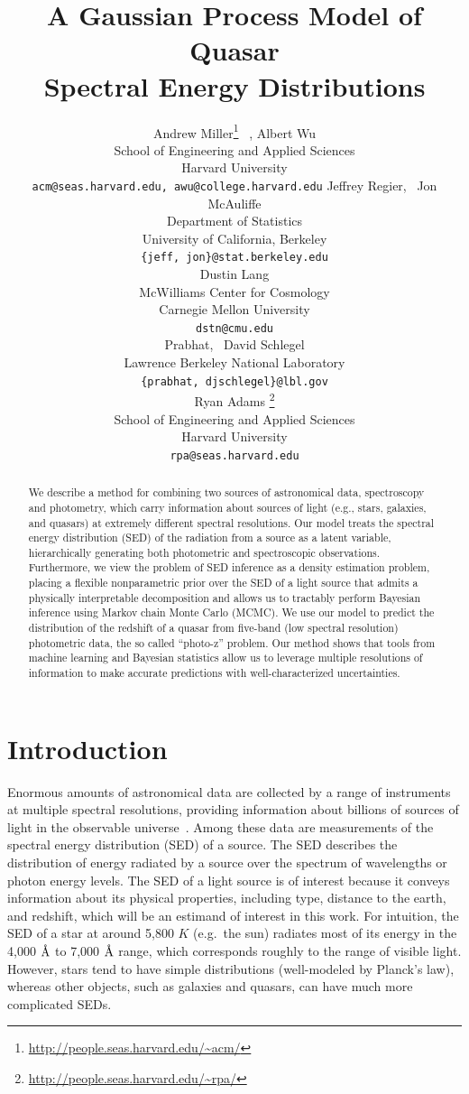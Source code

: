 \documentclass{article} %
\title{A Gaussian Process Model of Quasar \\ Spectral Energy Distributions}
\author{
Andrew Miller\thanks{\url{http://people.seas.harvard.edu/\~acm/}} \, ,  Albert Wu \\
School of Engineering and Applied Sciences\\
Harvard University\\
\texttt{acm@seas.harvard.edu, awu@college.harvard.edu}
\And
Jeffrey Regier, \, Jon McAuliffe \\
Department of Statistics \\
University of California, Berkeley \\
\texttt{\{jeff, jon\}@stat.berkeley.edu} \\
\And
Dustin Lang \\
McWilliams Center for Cosmology \\
Carnegie Mellon University \\
\texttt{dstn@cmu.edu} \\
\And
Prabhat, \, David Schlegel \\
Lawrence Berkeley National Laboratory \\
\texttt{\{prabhat, djschlegel\}@lbl.gov} \\
\And
Ryan Adams \thanks{\url{http://people.seas.harvard.edu/\~rpa/}}\\
School of Engineering and Applied Sciences\\
Harvard University\\
\texttt{rpa@seas.harvard.edu} \\
}
\begin{document}
\maketitle

\begin{abstract} 
We describe a method for combining two sources of astronomical data, spectroscopy and photometry, which carry information about sources of light (e.g., stars, galaxies, and quasars) at extremely different spectral resolutions. 
Our model treats the spectral energy distribution (SED) of the radiation from a source as a latent variable, hierarchically generating both photometric and spectroscopic observations.  
Furthermore, we view the problem of SED inference as a density estimation problem, placing a flexible nonparametric prior over the SED of a light source that admits a physically interpretable decomposition and allows us to tractably perform Bayesian inference using Markov chain Monte Carlo (MCMC).  
We use our model to predict the distribution of the redshift of a quasar from five-band (low spectral resolution) photometric data, the so called ``photo-z'' problem. 
Our method shows that tools from machine learning and Bayesian statistics allow us to leverage multiple resolutions of information to make accurate predictions with well-characterized uncertainties. 
\end{abstract} 

\section{Introduction}
Enormous amounts of astronomical data are collected by a range of instruments at multiple spectral resolutions, providing information about billions of sources of light in the observable universe~\cite{alam2015eleventh, martin2005galex}.  
Among these data are measurements of the spectral energy distribution (SED) of a source.  
The SED describes the distribution of energy radiated by a source over the spectrum of wavelengths or photon energy levels.
The SED of a light source is of interest because it conveys information about its physical properties, including type, distance to the earth, and redshift, which will be an estimand of interest in this work. 
For intuition, the SED of a star at around 5,800 $K$ (e.g.~the sun) radiates most of its energy in the 4,000 $\textup{\AA}$ to 7,000 $\textup{\AA}$ range, which corresponds roughly to the range of visible light.  
However, stars tend to have simple distributions (well-modeled by Planck's law), whereas other objects, such as galaxies and quasars, can have much more complicated SEDs.  
\end{document}
